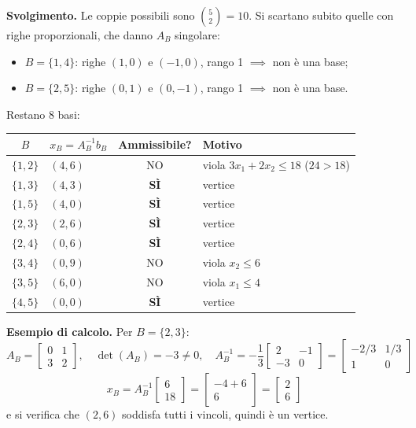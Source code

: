 \documentclass[12pt]{extarticle} %
\begin{document}
\noindent\textbf{Svolgimento.} Le coppie possibili sono $\binom{5}{2} = 10$. Si scartano subito quelle con righe proporzionali, che danno $A_B$ singolare:
\begin{itemize}
    \item $B=\{1,4\}$: righe $(1,0)$ e $(-1,0)$, rango 1 $\implies$ non è una base;
    \item $B=\{2,5\}$: righe $(0,1)$ e $(0,-1)$, rango 1 $\implies$ non è una base.
\end{itemize}
Restano 8 basi:
\begin{center}
\begin{tabular}{clcl}
\hline
$B$ & $x_B = A_B^{-1}b_B$ & Ammissibile? & Motivo \\
\hline
$\{1,2\}$ & $(4,6)$ & NO & viola $3x_1+2x_2 \le 18$ ($24 > 18$) \\
$\{1,3\}$ & $(4,3)$ & \textbf{SÌ} & vertice \\
$\{1,5\}$ & $(4,0)$ & \textbf{SÌ} & vertice \\
$\{2,3\}$ & $(2,6)$ & \textbf{SÌ} & vertice \\
$\{2,4\}$ & $(0,6)$ & \textbf{SÌ} & vertice \\
$\{3,4\}$ & $(0,9)$ & NO & viola $x_2 \le 6$ \\
$\{3,5\}$ & $(6,0)$ & NO & viola $x_1 \le 4$ \\
$\{4,5\}$ & $(0,0)$ & \textbf{SÌ} & vertice \\
\hline
\end{tabular}
\end{center}

\noindent\textbf{Esempio di calcolo.} Per $B=\{2,3\}$:
\[
A_B = \begin{bmatrix} 0 & 1 \\ 3 & 2\end{bmatrix}, \quad \det(A_B) = -3 \ne 0, \quad
A_B^{-1} = -\frac{1}{3}\begin{bmatrix} 2 & -1 \\ -3 & 0 \end{bmatrix} = \begin{bmatrix} -2/3 & 1/3 \\ 1 & 0\end{bmatrix}
\]
\[
x_B = A_B^{-1}\begin{bmatrix} 6 \\ 18\end{bmatrix} = \begin{bmatrix} -4 + 6 \\ 6 \end{bmatrix} = \begin{bmatrix} 2 \\ 6\end{bmatrix}
\]
e si verifica che $(2,6)$ soddisfa tutti i vincoli, quindi è un vertice.
\end{document}
